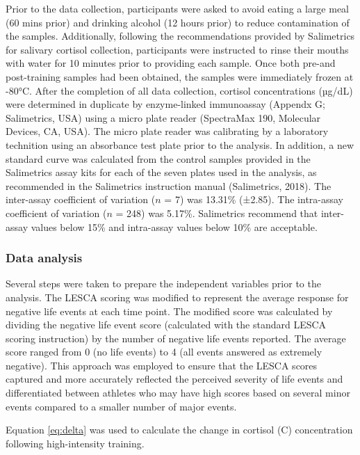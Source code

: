 \documentclass[
  english,
  man,floatsintext]{apa6}
\begin{document}
Prior to the data collection, participants were asked to avoid eating a large meal (60 mins prior) and drinking alcohol (12 hours prior) to reduce contamination of the samples.
Additionally, following the recommendations provided by Salimetrics for salivary cortisol collection, participants were instructed to rinse their mouths with water for 10 minutes prior to providing each sample.
Once both pre-and post-training samples had been obtained, the samples were immediately frozen at -80°C. After the completion of all data collection, cortisol concentrations (µg/dL) were determined in duplicate by enzyme-linked immunoassay (Appendx G; Salimetrics, USA) using a micro plate reader (SpectraMax 190, Molecular Devices, CA, USA).
The micro plate reader was calibrating by a laboratory technition using an absorbance test plate prior to the analysis.
In addition, a new standard curve was calculated from the control samples provided in the Salimetrics assay kits for each of the seven plates used in the analysis, as recommended in the Salimetrics instruction manual (Salimetrics, 2018).
The inter-assay coefficient of variation (\(n\) = 7) was 13.31\% (±2.85). The intra-assay coefficient of variation (\(n\) = 248) was 5.17\%.
Salimetrics recommend that inter-assay values below 15\% and intra-assay values below 10\% are acceptable.

\hypertarget{data-analysis-1}{%
\subsubsection{Data analysis}\label{data-analysis-1}}

Several steps were taken to prepare the independent variables prior to the analysis.
The LESCA scoring was modified to represent the average response for negative life events at each time point.
The modified score was calculated by dividing the negative life event score (calculated with the standard LESCA scoring instruction) by the number of negative life events reported.
The average score ranged from 0 (no life events) to 4 (all events answered as extremely negative).
This approach was employed to ensure that the LESCA scores captured and more accurately reflected the perceived severity of life events and differentiated between athletes who may have high scores based on several minor events compared to a smaller number of major events.

Equation \eqref{eq:delta} was used to calculate the change in cortisol (C) concentration following high-intensity training.
\end{document}
